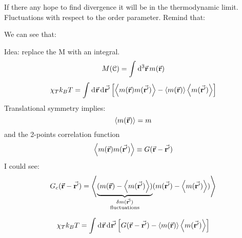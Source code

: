 \documentclass[../main/main.tex]{subfiles}
\begin{document}

If there any hope to find divergence it will be in the thermodynamic limit. Fluctuations with respect to the order parameter. Remind that:


We can see that:


Idea: replace the M with an integral.
\begin{equation}
  M(\mathcal{C}) = \int_{}^{} \dd[3]{\va{r} }  m(\va{r} )
\end{equation}
\begin{equation}
  \chi _T k_B T = \int_{}^{} \dd[]{\va{r} }  \dd[]{\va{r'} } \qty[\expval{m(\va{r} ) m(\va{r'} )}- \expval{m(\va{r} )} \expval{m(\va{r'} )}   ]
\end{equation}
Translational symmetry implies:
\begin{equation}
  \expval{m(\va{r} )} = m
\end{equation}
and the 2-points correlation function
\begin{equation}
  \expval{m(\va{r} ) m(\va{r'} )} \equiv G (\va{r}-\va{r'}  )
\end{equation}
I could see:
\begin{equation}
  G_c (\va{r}-\va{r'}  ) = \expval{ \underbrace{(m(\va{r} )-\expval{m(\va{r'} )} )}_{\substack{ \delta m (\va{r'} ) \\ \text{fluctuations}} }  (m(\va{r'} )-\expval{m(\va{r'} )} )}
\end{equation}

\begin{equation}
  \chi _T k_B T = \int_{}^{} \dd[]{\va{r} } \dd[]{\va{r'} } \qty[G(\va{r} -\va{r'} )- \expval{m(\va{r} )}\expval{m(\va{r'} )}  ]
\end{equation}
\end{document}
